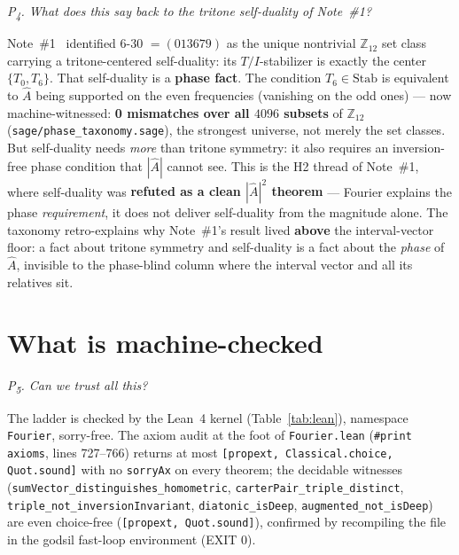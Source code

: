 \documentclass[11pt]{article}
\newcommand{\lean}[1]{\texttt{#1}}
\newcommand{\Ztwelve}{\mathbb{Z}_{12}}
\newcommand{\Ahat}{\hat{A}}
\newcommand{\Stab}{\mathrm{Stab}}
\newcommand{\question}[1]{\smallskip\noindent\textit{#1}\smallskip}
\begin{document}
\question{P\textsubscript{4}. What does this say back to the tritone self-duality of Note~\#1?}

Note~\#1~\cite{Note1} identified 6-30 $=(013679)$ as the unique nontrivial $\Ztwelve$ set class carrying a
tritone-centered self-duality: its $T/I$-stabilizer is exactly the center $\{T_0,T_6\}$. That self-duality
is a \textbf{phase fact}. The condition $T_6\in\Stab$ is equivalent to $\Ahat$ being supported on the even
frequencies (vanishing on the odd ones) --- now machine-witnessed: \textbf{0 mismatches over all $4096$
subsets} of $\Ztwelve$ (\lean{sage/phase\_taxonomy.sage}), the strongest universe, not merely the set
classes. But self-duality needs \emph{more} than tritone symmetry: it also requires an inversion-free
phase condition that $|\Ahat|$ cannot see. This is the H2 thread of Note~\#1, where self-duality was
\textbf{refuted as a clean $|\Ahat|^2$ theorem} --- Fourier explains the phase \emph{requirement}, it does
not deliver self-duality from the magnitude alone. The taxonomy retro-explains why Note~\#1's result lived
\textbf{above} the interval-vector floor: a fact about tritone symmetry and self-duality is a fact about
the \emph{phase} of $\Ahat$, invisible to the phase-blind column where the interval vector and all its
relatives sit.

\section{What is machine-checked}\label{sec:checked}

\question{P\textsubscript{5}. Can we trust all this?}

The ladder is checked by the Lean~4 kernel (Table~\ref{tab:lean}), namespace \lean{Fourier}, sorry-free.
The axiom audit at the foot of \lean{Fourier.lean} (\lean{\#print axioms}, lines 727--766) returns at most
\lean{[propext, Classical.choice, Quot.sound]} with no \lean{sorryAx} on every theorem; the decidable
witnesses (\lean{sumVector\_distinguishes\_homometric}, \lean{carterPair\_triple\_distinct},
\lean{triple\_not\_inversionInvariant}, \lean{diatonic\_isDeep}, \lean{augmented\_not\_isDeep}) are even
choice-free (\lean{[propext, Quot.sound]}), confirmed by recompiling the file in the godsil fast-loop
environment (EXIT 0).
\end{document}
